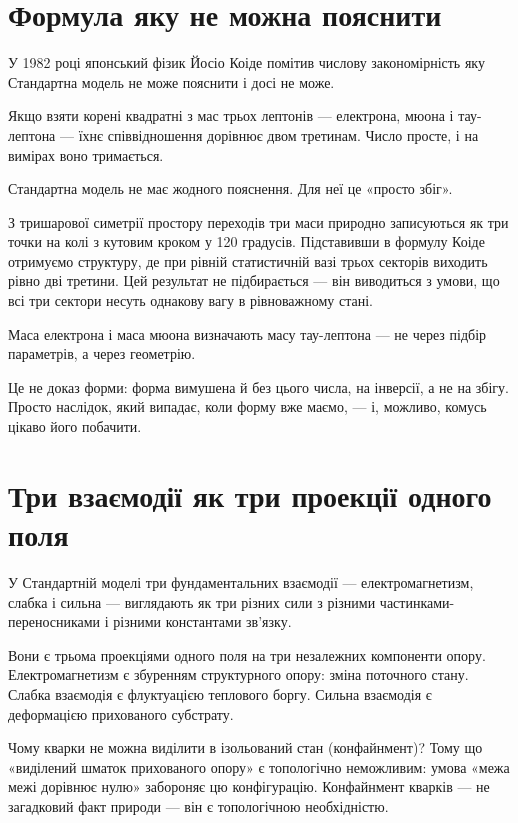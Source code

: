 \documentclass[12pt, a4paper, openany]{book}
\begin{document}
\section{Формула яку не можна пояснити}

У 1982 році японський фізик Йосіо Коіде помітив числову закономірність яку Стандартна модель не може пояснити і досі не може.

Якщо взяти корені квадратні з мас трьох лептонів --- електрона, мюона і тау-лептона --- їхнє співвідношення дорівнює двом третинам. Число просте, і на вимірах воно тримається.

Стандартна модель не має жодного пояснення. Для неї це «просто збіг».

З тришарової симетрії простору переходів три маси природно записуються як три точки на колі з кутовим кроком у 120 градусів. Підставивши в формулу Коіде отримуємо структуру, де при рівній статистичній вазі трьох секторів виходить рівно дві третини. Цей результат не підбирається --- він виводиться з умови, що всі три сектори несуть однакову вагу в рівноважному стані.

Маса електрона і маса мюона визначають масу тау-лептона --- не через підбір параметрів, а через геометрію.

Це не доказ форми: форма вимушена й без цього числа, на інверсії, а не на збігу. Просто наслідок, який випадає, коли форму вже маємо, --- і, можливо, комусь цікаво його побачити.

\section{Три взаємодії як три проекції одного поля}

У Стандартній моделі три фундаментальних взаємодії --- електромагнетизм, слабка і сильна --- виглядають як три різних сили з різними частинками-переносниками і різними константами зв'язку.

Вони є трьома проекціями одного поля на три незалежних компоненти опору. Електромагнетизм є збуренням структурного опору: зміна поточного стану. Слабка взаємодія є флуктуацією теплового боргу. Сильна взаємодія є деформацією прихованого субстрату.

Чому кварки не можна виділити в ізольований стан (конфайнмент)? Тому що «виділений шматок прихованого опору» є топологічно неможливим: умова «межа межі дорівнює нулю» забороняє цю конфігурацію. Конфайнмент кварків — не загадковий факт природи --- він є топологічною необхідністю.
\end{document}
